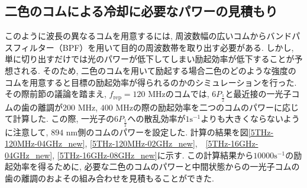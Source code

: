 \documentclass[uplatex, dvipdfmx, a4paper, report, papersize, 11pt]{jsbook}
\begin{document}
\subsection{二色のコムによる冷却に必要なパワーの見積もり}
このように波長の異なるコムを用意するには, 周波数幅の広いコムからバンドパスフィルター（BPF）を用いて目的の周波数帯を取り出す必要がある. しかし, 単に切り出すだけでは光のパワーが低下してしまい励起効率が低下することが予想される. そのため, 二色のコムを用いて励起する場合二色のどのような強度のコムを用意すると目標の励起効率が得られるのかのシミュレーションを行った. その際前節の議論を踏まえ, $f_{\mathrm{rep}} = 120$ MHzのコムでは, $6P_{\frac{1}{2}}$と最近接の一光子コムの歯の離調が$200$ MHz, $400$ MHzの際の励起効率を二つのコムのパワーに応じて計算した. この際, 一光子の$6P_{\frac{1}{2}}$への散乱効率が$1 \mathrm{s^{-1}}$よりも大きくならないように注意して, $894$ nm側のコムのパワーを設定した. 計算の結果を図\ref{5THz-120MHz-04GHz_new}, \ref{5THz-120MHz-02GHz_new},　\ref{5THz-16GHz-04GHz_new}, \ref{5THz-16GHz-08GHz_new}に示す. この計算結果から$10000 \mathrm{s^{-1}}$の励起効率を得るために, 必要な二色のコムのパワーと中間状態からの一光子コムの歯の離調のおよその組み合わせを見積もることができた. \\
\end{document}
